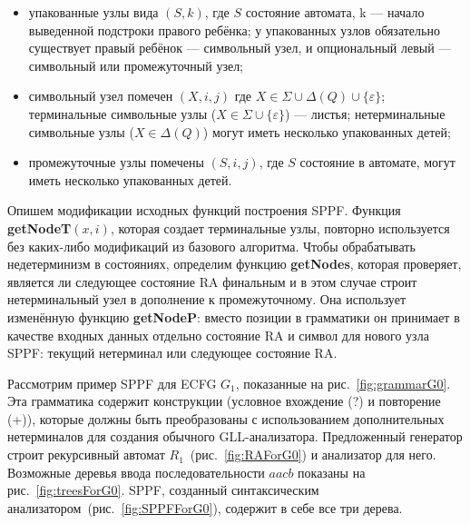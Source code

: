 \documentclass[14pt]{matmex-diploma-custom}
\begin{document}
	\begin{itemize}
		\item упакованные узлы вида $(S, k)$, где $S$ состояние автомата, k --- начало выведенной
		подстроки правого ребёнка; у упакованных узлов обязательно существует правый ребёнок ---
		символьный узел, и опциональный левый --- символьный или промежуточный узел;
		\item символьный узел помечен $(X, i, j)$ где $X \in \Sigma \cup \Delta(Q) \cup \{\varepsilon\}$;
		терминальные символьные узлы ($X \in \Sigma \cup \{\varepsilon\}$) --- листья;
		нетерминальные символьные узлы ($X \in \Delta(Q)$) могут иметь несколько упакованных детей;
		\item промежуточные узлы помечены $ (S, i, j) $, где $S$ состояние в автомате, могут иметь несколько упакованных детей.
	\end{itemize}
	
	Опишем модификации исходных функций построения SPPF.
	Функция \textbf{getNodeT$ (x, i) $}, которая создает терминальные узлы, 
	повторно используется без каких-либо модификаций из базового алгоритма.
	Чтобы обрабатывать недетерминизм в состояниях, определим функцию 
	\textbf{getNodes}, которая проверяет, является ли следующее состояние RA финальным
	и в этом случае строит нетерминальный узел в дополнение к промежуточному.
	Она использует изменённую функцию \textbf{getNodeP}: вместо позиции в грамматики он 
	принимает в качестве входных данных отдельно состояние RA и символ для нового узла SPPF:
	текущий нетерминал или следующее состояние RA.
	
	
	
	
	Рассмотрим пример SPPF для ECFG $ G_1 $, показанные на рис.~\ref{fig:grammarG0}.
	Эта грамматика содержит конструкции (условное вхождение (?) и повторение (+)),
	которые должны быть преобразованы с использованием дополнительных нетерминалов 
	для создания обычного GLL-анализатора.
	Предложенный генератор строит рекурсивный автомат $ R_1 $~(рис.~\ref{fig:RAForG0})
	и анализатор для него. Возможные деревья ввода последовательности $ aacb $ показаны 
	на рис.~\ref{fig:treesForG0}. SPPF, созданный синтаксическим анализатором~(рис.~\ref{fig:SPPFForG0}),
	содержит в себе все три дерева.
	
\end{document}
